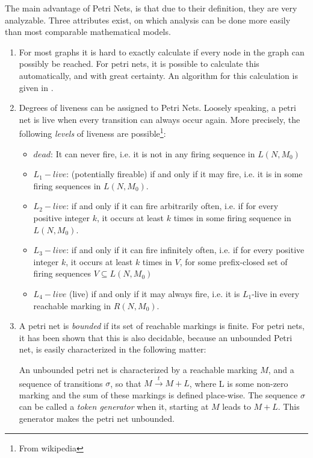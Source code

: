 \documentclass[a4paper,10pt]{article}
\begin{document}
The main advantage of Petri Nets, is that due to their definition, they are very
analyzable. Three attributes exist, on which analysis can be done more easily
than most comparable mathematical models.
\begin{enumerate}
    \item {}
    For most graphs it is hard to exactly calculate if every node in the graph
    can possibly be reached. For petri nets, it is possible to calculate this
    automatically, and with great certainty. An algorithm for this calculation
    is given in \cite{mayr1981algorithm}.
    \item {}
    Degrees of liveness can be assigned to Petri Nets. Loosely speaking, a petri
    net is live when every transition can always occur again. More precisely,
    the following \textit{levels} of liveness are possible\footnote{From
    wikipedia}:
    \begin{itemize}
        \item $dead$: It can never fire, i.e. it is not in any firing sequence
        in $L(N, M_0)$
        \item $L_1 -live$: (potentially fireable) if and only if it may fire, i.e. it is in
        some firing sequences in $L(N, M_0)$.
        \item $L_{2}-live$: if and only if it can fire arbitrarily often, i.e. if for every
        positive integer $k$, it occurs at least $k$ times in some firing
        sequence in $L(N, M_0)$.
        \item $L_{3}-live$: if and only if it can fire infinitely often, i.e. if for every
        positive integer $k$, it occurs at least $k$ times in $V$, for some
        prefix-closed set of firing sequences $V \subseteq L(N, M_0)$
        \item $L_4 -live$ (live) if and only if it may always fire, i.e. it is $L_1$-live
        in every reachable marking in $R(N, M_0)$.
    \end{itemize}
    \item {}
    A petri net is \textit{bounded} if its set of reachable markings is finite.
    For petri nets, it has been shown that this is also decidable, because an
    unbounded Petri net, is easily characterized in the following matter:

    An unbounded petri net is characterized by a reachable marking $M$, and a
    sequence of transitions $\sigma$, so that $M \stackrel{t}{\longrightarrow} M
    + L$, where L is some non-zero marking and the sum of these markings is
    defined place-wise. The sequence $\sigma$ can be called a \textit{token
    generator} when it, starting at $M$ leads to $M + L$. This generator makes
    the petri net unbounded.
\end{enumerate}
\end{document}
